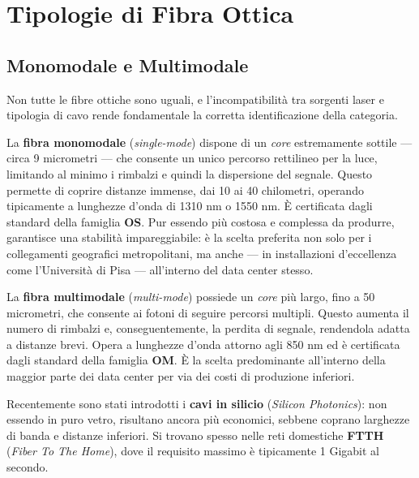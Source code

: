 \documentclass[
  italian,
  openany]{book}
\begin{document}
\section{Tipologie di Fibra Ottica}\label{tipologie-di-fibra-ottica}

\subsection{Monomodale e Multimodale}\label{monomodale-e-multimodale}

Non tutte le fibre ottiche sono uguali, e l'incompatibilità tra sorgenti
laser e tipologia di cavo rende fondamentale la corretta identificazione
della categoria.

La \textbf{fibra monomodale} (\emph{single-mode}) dispone di un
\emph{core} estremamente sottile --- circa 9 micrometri --- che consente
un unico percorso rettilineo per la luce, limitando al minimo i rimbalzi
e quindi la dispersione del segnale. Questo permette di coprire distanze
immense, dai 10 ai 40 chilometri, operando tipicamente a lunghezze
d'onda di 1310 nm o 1550 nm. È certificata dagli standard della famiglia
\textbf{OS}. Pur essendo più costosa e complessa da produrre, garantisce
una stabilità impareggiabile: è la scelta preferita non solo per i
collegamenti geografici metropolitani, ma anche --- in installazioni
d'eccellenza come l'Università di Pisa --- all'interno del data center
stesso.

La \textbf{fibra multimodale} (\emph{multi-mode}) possiede un
\emph{core} più largo, fino a 50 micrometri, che consente ai fotoni di
seguire percorsi multipli. Questo aumenta il numero di rimbalzi e,
conseguentemente, la perdita di segnale, rendendola adatta a distanze
brevi. Opera a lunghezze d'onda attorno agli 850 nm ed è certificata
dagli standard della famiglia \textbf{OM}. È la scelta predominante
all'interno della maggior parte dei data center per via dei costi di
produzione inferiori.

Recentemente sono stati introdotti i \textbf{cavi in silicio}
(\emph{Silicon Photonics}): non essendo in puro vetro, risultano ancora
più economici, sebbene coprano larghezze di banda e distanze inferiori.
Si trovano spesso nelle reti domestiche \textbf{FTTH} (\emph{Fiber To
The Home}), dove il requisito massimo è tipicamente 1 Gigabit al
secondo.
\end{document}
